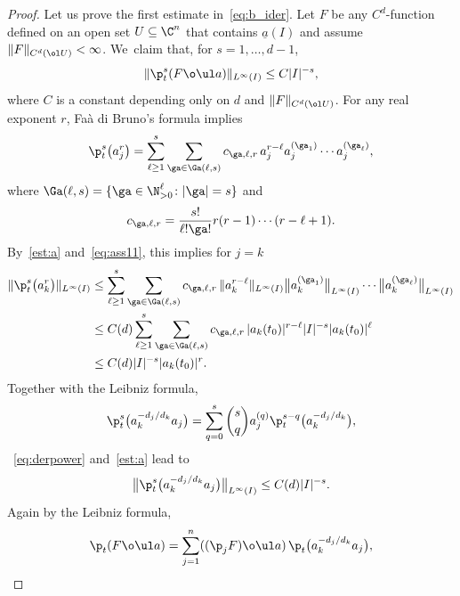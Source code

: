\begin{proof}
 Let us prove the first estimate in~\eqref{eq:b_ider}.
 Let $F$ be any $C^d$-function defined on an open set $U\subseteq \C^{n}$ that contains
 $\underline a(I)$ and assume $\|F\|_{C^d(\ol U)} < \infty$. We~claim that, for $s = 1,\dots,d-1$,
 \begin{gather} \label{eq:B2}
 \|\p_t^s (F \o \ul a)\|_{L^\infty(I)} \le C |I|^{-s},
 \end{gather}
 where
 $C$ is a constant depending only on $d$ and $\|F\|_{C^d(\ol U)}$.
 For any real exponent $r$, Fa\`a di Bruno's formula implies
 \begin{gather} \label{FaadiBruno}
 \p_t^{s} \big(a_j^{r} \big) =
 \sum_{\ell \ge 1}^{s} \sum_{\ga \in \Ga(\ell,s)} c_{\ga,\ell,r}
 \, a_j^{r-\ell} a_j^{(\ga_1)} \cdots a_j^{(\ga_\ell)},
 \end{gather}
 where $\Ga(\ell,s) = \{\ga \in \N_{>0}^\ell \colon |\ga| = s\}$ and
 \begin{gather*}
 c_{\ga,\ell,r}= \frac{s!}{\ell! \ga!} r(r-1) \cdots (r-\ell+1).
 \end{gather*}
 By~\eqref{est:a} and~\eqref{eq:ass11}, this implies for $j=k$
 \begin{align}
 \|\p_t^{s} \big( a_k^{r} \big)\|_{L^\infty(I)}
 &\le
 \sum_{\ell \ge 1}^{s} \sum_{\ga \in \Ga(\ell,s)} c_{\ga,\ell,r}
 \, \|a_k^{r-\ell}\|_{L^\infty(I)} \big\|a_k^{(\ga_1)}\big\|_{L^\infty(I)}
 \cdots \big\|a_k^{(\ga_\ell)}\big\|_{L^\infty(I)}
 \notag \\
 &\le
 C(d) \sum_{\ell \ge 1}^{s} \sum_{\ga \in \Ga(\ell,s)} c_{\ga,\ell,r}
 \, |a_k(t_0)|^{r-\ell}
 |I|^{-s} |a_k(t_0)|^{\ell}
 \notag \\
 &\le
 C(d)
 |I|^{-s} |a_k(t_0)|^{r }.\label{eq:derpower}
 \end{align}
 Together with the Leibniz formula,
 \begin{gather*}
 \p_t^s \big( a_k^{- d_j/d_k} a_j\big)
 = \sum_{q=0}^{s} \binom{s}{q} a_j^{(q)} \p_t^{s-q} \big( a_k^{- d_j/d_k} \big),
 \end{gather*}
~\eqref{eq:derpower} and~\eqref{est:a} lead to
 \begin{gather} \label{eq:underlinea}
\big \|\p_t^s \big(a_k^{- d_j/d_k} a_j\big) \big\|_{L^\infty(I)}
 \le C(d) |I|^{-s}.
 \end{gather}
 Again by the Leibniz formula,
 \begin{align*}
 \p_t (F \o \ul a)
 &= \sum_{j=1}^n ((\p_{j} F)\o \ul a)\, \p_t \big( a_k^{- d_j/d_k} a_j\big),
 \\

\end{align*}
\end{proof}
